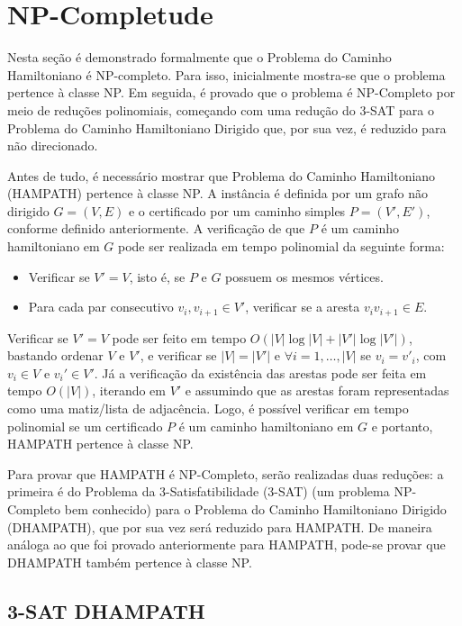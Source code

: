 \section{NP-Completude}

Nesta seção é demonstrado formalmente que o Problema do Caminho Hamiltoniano é NP-completo. Para isso, inicialmente mostra-se que o problema pertence à classe NP. Em seguida, é provado que o problema é NP-Completo por meio de reduções polinomiais, começando com uma redução do 3-SAT para o Problema do Caminho Hamiltoniano Dirigido que, por sua vez, é reduzido para não direcionado.

Antes de tudo, é necessário mostrar que Problema do Caminho Hamiltoniano (HAMPATH) pertence à classe NP. A instância é definida por um grafo não dirigido $G = (V, E)$ e o certificado por um caminho simples $P = (V', E')$, conforme definido anteriormente. A verificação de que $P$ é um caminho hamiltoniano em $G$ pode ser realizada em tempo polinomial da seguinte forma:

\begin{itemize}
    \item Verificar se $V' = V$, isto é, se $P$ e $G$ possuem os mesmos vértices.
    \item Para cada par consecutivo $v_i, v_{i+1}\in V'$, verificar se a aresta $v_iv_{i+1} \in E$.
\end{itemize}

Verificar se $V'=V$  pode ser feito em tempo $O(|V| \log |V| + |V'| \log |V'|)$, bastando ordenar $V$ e $V'$, e verificar se $|V|=|V'|$ e $\forall i= 1,\ldots,|V|$ se $v_i=v'_i$, com $v_i\in V$ e $v_i'\in V'$. Já a verificação da existência das arestas pode ser feita em tempo $O(|V|)$, iterando em $V'$ e assumindo que as arestas foram representadas como uma matiz/lista de adjacência. Logo, é possível verificar em tempo polinomial se um certificado $P$ é um caminho hamiltoniano em $G$ e portanto, HAMPATH pertence à classe NP.

Para provar que HAMPATH é NP-Completo, serão realizadas duas reduções: a primeira é do Problema da 3-Satisfatibilidade (3-SAT) (um problema NP-Completo \cite{Karp1972, cormen2012} bem conhecido) para o Problema do Caminho Hamiltoniano Dirigido (DHAMPATH), que por sua vez será reduzido para HAMPATH. De maneira análoga ao que foi provado anteriormente para HAMPATH, pode-se provar que DHAMPATH também pertence à classe NP.

\subsection{3-SAT \reduct DHAMPATH \texorpdfstring{\cite{Kleinberg2006}}{(Kleinberg; Tardos, 2006)}}

